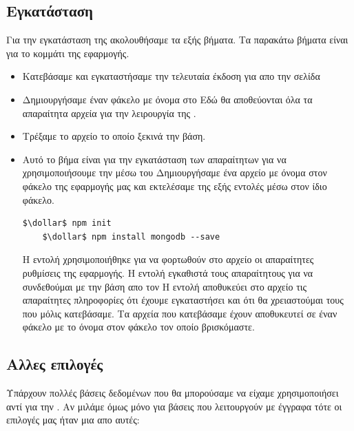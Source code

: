 \subsection*{Εγκατάσταση}
\quad Για την εγκατάσταση της  ακολουθήσαμε τα εξής βήματα.
Τα παρακάτω βήματα είναι για το  κομμάτι της εφαρμογής.
\begin{itemize}
    \item Κατεβάσαμε και εγκαταστήσαμε την τελευταία  έκδοση 
    για  απο την σελίδα 
    \item Δημιουργήσαμε έναν φάκελο με όνομα  στο  
    Εδώ θα αποθεύονται όλα τα απαραίτητα αρχεία για την λειρουργία της .
    \item Τρέξαμε το αρχείο  το οποίο ξεκινά την βάση.
    \item Αυτό το βήμα είναι για την εγκατάσταση των απαραίτητων  για να χρησιμοποιήσουμε την  μέσω του   Δημιουργήσαμε ένα αρχείο με όνομα  στον φάκελο της εφαρμογής μας και εκτελέσαμε της εξής εντολές μέσω  στον ίδιο φάκελο.
    \begin{lstlisting}[language=command.com]
    $\dollar$ npm init
    $\dollar$ npm install mongodb --save
    \end{lstlisting}
    Η εντολή  χρησιμοποιήθηκε για να φορτωθούν στο αρχείο  οι απαραίτητες ρυθμίσεις της εφαρμογής. 
    Η εντολή  εγκαθιστά τους απαραίτητους  για να συνδεθούμαι με την βάση απο τον  Η εντολή  αποθυκεύει στο αρχείο  τις απαραίτητες πληροφορίες ότι έχουμε εγκαταστήσει και ότι θα χρειαστούμαι τους  που μόλις κατεβάσαμε. Τα αρχεία που κατεβάσαμε έχουν αποθυκευτεί σε έναν φάκελο με το όνομα  στον φάκελο τον οποίο βρισκόμαστε.
\end{itemize}

\subsection*{Αλλες επιλογές}
\quad Υπάρχουν πολλές βάσεις δεδομένων που θα μπορούσαμε να είχαμε χρησιμοποιήσει αντί για την . Αν μιλάμε όμως μόνο για  βάσεις που λειτουργούν με έγγραφα τότε οι επιλογές μας ήταν μια απο αυτές: 

